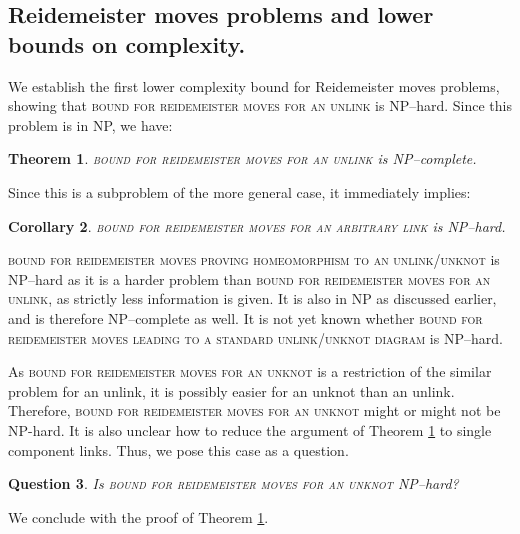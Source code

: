 \documentclass[12pt]{amsart}
\newtheorem{thm}{Theorem}
\newtheorem{corr}[thm]{Corollary}
\newtheorem{question}[thm]{Question}
\theoremstyle{definition}
\theoremstyle{remark}
\begin{document}
\subsection{Reidemeister moves problems and lower bounds on complexity.}

We establish the first lower complexity bound for Reidemeister moves problems, showing that \textsc{bound for reidemeister moves for an unlink} is NP--hard.
Since this problem is in NP, we have:

\begin{thm}
\textsc{bound for reidemeister moves for an unlink} is NP--complete.
\label{thm_reid}
\end{thm}

Since this is a subproblem of the more general case, it immediately implies:
\begin{corr}
\textsc{bound for reidemeister moves for an arbitrary link} is NP--hard.
\end{corr}


\textsc{bound for reidemeister moves proving homeomorphism to an unlink/unknot} is NP--hard as it is a harder problem than \textsc{bound for reidemeister moves for an unlink}, as strictly less information is given.
It is also in NP as discussed earlier, and is therefore NP--complete as well.
It is not yet known whether \textsc{bound for reidemeister moves leading to a standard unlink/unknot diagram} is NP--hard.

As \textsc{bound for reidemeister moves for an unknot} is a restriction of the similar problem for an unlink, it is possibly easier for an unknot than an unlink.
Therefore, \textsc{bound for reidemeister moves for an unknot} might or might not be NP-hard.
It is also unclear how to reduce the argument of Theorem \ref{thm_reid} to single component links.
Thus, we pose this case as a question.

\begin{question}
Is \textsc{bound for reidemeister moves for an unknot} NP--hard?
\end{question}

We conclude with the proof of Theorem \ref{thm_reid}.
\end{document}
